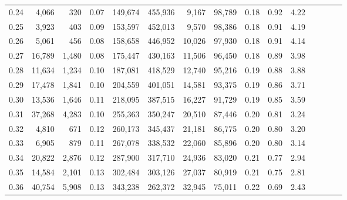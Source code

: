 \begin{tabular}{rrrcrrrrrrrrrrr}
0.24 &   4,066 &    320 &                                       0.07 &  149,674 &  455,936 &    9,167 &   98,789 &  0.18 &  0.92 &                         4.22 \\
0.25 &   3,923 &    403 &                                       0.09 &  153,597 &  452,013 &    9,570 &   98,386 &  0.18 &  0.91 &                         4.19 \\
0.26 &   5,061 &    456 &                                       0.08 &  158,658 &  446,952 &   10,026 &   97,930 &  0.18 &  0.91 &                         4.14 \\
0.27 &  16,789 &  1,480 &                                       0.08 &  175,447 &  430,163 &   11,506 &   96,450 &  0.18 &  0.89 &                         3.98 \\
0.28 &  11,634 &  1,234 &                                       0.10 &  187,081 &  418,529 &   12,740 &   95,216 &  0.19 &  0.88 &                         3.88 \\
0.29 &  17,478 &  1,841 &                                       0.10 &  204,559 &  401,051 &   14,581 &   93,375 &  0.19 &  0.86 &                         3.71 \\
0.30 &  13,536 &  1,646 &                                       0.11 &  218,095 &  387,515 &   16,227 &   91,729 &  0.19 &  0.85 &                         3.59 \\
0.31 &  37,268 &  4,283 &                                       0.10 &  255,363 &  350,247 &   20,510 &   87,446 &  0.20 &  0.81 &                         3.24 \\
0.32 &   4,810 &    671 &                                       0.12 &  260,173 &  345,437 &   21,181 &   86,775 &  0.20 &  0.80 &                         3.20 \\
0.33 &   6,905 &    879 &                                       0.11 &  267,078 &  338,532 &   22,060 &   85,896 &  0.20 &  0.80 &                         3.14 \\
0.34 &  20,822 &  2,876 &                                       0.12 &  287,900 &  317,710 &   24,936 &   83,020 &  0.21 &  0.77 &                         2.94 \\
0.35 &  14,584 &  2,101 &                                       0.13 &  302,484 &  303,126 &   27,037 &   80,919 &  0.21 &  0.75 &                         2.81 \\
0.36 &  40,754 &  5,908 &                                       0.13 &  343,238 &  262,372 &   32,945 &   75,011 &  0.22 &  0.69 &                         2.43 \\

\end{tabular}
